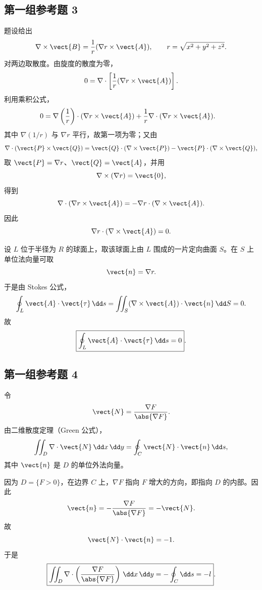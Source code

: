 \subsection*{第一组参考题 3}
\begin{xsolution}
题设给出
\[
  \nabla\times\vect{B}=\frac1r(\nabla r\times\vect{A}),
  \qquad r=\sqrt{x^2+y^2+z^2}.
\]
对两边取散度。由旋度的散度为零，
\[
  0=\nabla\cdot\left[\frac1r(\nabla r\times\vect{A})\right].
\]
利用乘积公式，
\begin{align*}
  0
  &=\nabla\left(\frac1r\right)\cdot(\nabla r\times\vect{A})
    +\frac1r\nabla\cdot(\nabla r\times\vect{A}).
\end{align*}
其中 $\nabla(1/r)$ 与 $\nabla r$ 平行，故第一项为零；又由
\[
  \nabla\cdot(\vect{P}\times\vect{Q})
  =\vect{Q}\cdot(\nabla\times\vect{P})
  -\vect{P}\cdot(\nabla\times\vect{Q}),
\]
取 $\vect{P}=\nabla r$、$\vect{Q}=\vect{A}$，并用
\[
  \nabla\times(\nabla r)=\vect{0},
\]
得到
\[
  \nabla\cdot(\nabla r\times\vect{A})
  =-\nabla r\cdot(\nabla\times\vect{A}).
\]
因此
\[
  \nabla r\cdot(\nabla\times\vect{A})=0.
\]

设 $L$ 位于半径为 $R$ 的球面上，取该球面上由 $L$ 围成的一片定向曲面 $S$。在 $S$ 上单位法向量可取
\[
  \vect{n}=\nabla r.
\]
于是由 Stokes 公式，
\[
  \oint_L\vect{A}\cdot\vect{\tau}\,\dd s
  =\iint_S(\nabla\times\vect{A})\cdot\vect{n}\,\dd S
  =0.
\]
故
\[
  \boxed{\oint_L\vect{A}\cdot\vect{\tau}\,\dd s=0}.
\]
\end{xsolution}

\subsection*{第一组参考题 4}
\begin{xsolution}
令
\[
  \vect{N}=\frac{\nabla F}{\abs{\nabla F}}.
\]
由二维散度定理（Green 公式），
\[
  \iint_D\nabla\cdot\vect{N}\,\dd x\,\dd y
  =\oint_C\vect{N}\cdot\vect{n}\,\dd s,
\]
其中 $\vect{n}$ 是 $D$ 的单位外法向量。

因为 $D=\{F>0\}$，在边界 $C$ 上，$\nabla F$ 指向 $F$ 增大的方向，即指向 $D$ 的内部。因此
\[
  \vect{n}=-\frac{\nabla F}{\abs{\nabla F}}=-\vect{N}.
\]
故
\[
  \vect{N}\cdot\vect{n}=-1.
\]
于是
\[
  \boxed{
  \iint_D\nabla\cdot\left(\frac{\nabla F}{\abs{\nabla F}}\right)\,\dd x\,\dd y
  =-\oint_C\dd s=-l
  }.
\]
\end{xsolution}

